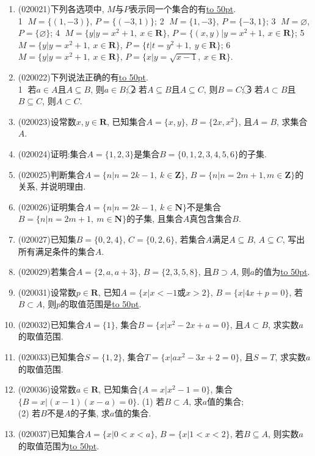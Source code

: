\documentclass[10pt,a4paper]{article}
\newcommand{\blank}[1]{\underline{\hbox to #1pt{}}}
\begin{document}
\begin{enumerate}[1.]
\item {\tiny (020021)}下列各选项中, $M$与$P$表示同一个集合的有\blank{50}.\\
\textcircled{1} $M=\{(1, -3)\}$, $P=\{(-3, 1)\}$; \textcircled{2} $M=\{1, -3\}$, $P=\{-3, 1\}$; \textcircled{3} $M=\varnothing$, $P=\{\varnothing\}$; \textcircled{4} $M=\{y|y=x^2+1, \  x\in\mathbf{R}\}$, $P=\{(x, y)|y=x^2+1, \ x\in\mathbf{R}\}$; \textcircled{5} $M=\{y|y=x^2+1, \  x\in\mathbf{R}\}$, $P=\{t|t=y^2+1, \ y\in\mathbf{R}\}$; \textcircled{6} $M=\{y|y=x^2+1, \  x\in\mathbf{R}\}$, $P=\{x|y=\sqrt{x-1},\  x\in\mathbf{R}\}$.
\item {\tiny (020022)}下列说法正确的有\blank{50}.\\
\textcircled{1} 若$a\in A$且$A\subseteq B$, 则$a\in B$; \textcircled{2} 若$A\subseteq B$且$A\subseteq C$, 则$B=C$; \textcircled{3} 若$A\subset B$且$B\subseteq C$, 则$A\subset C$.
\item {\tiny (020023)}设常数$x,y\in \mathbf{R}$, 已知集合$A=\{x, y\}$, $B=\{2x, x^2\}$, 且$A=B$, 求集合$A$.
\item {\tiny (020024)}证明:集合$A=\{1,2,3\}$是集合$B=\{0,1,2,3,4,5,6\}$的子集.
\item {\tiny (020025)}判断集合$A=\{n|n=2k-1,\ k\in \mathbf{Z}\}$, $B=\{n|n=2m+1,m\in \mathbf{Z}\}$的关系, 并说明理由.
\item {\tiny (020026)}证明集合$A=\{n|n=2k-1,\ k\in \mathbf{N}\}$不是集合$B=\{n|n=2m+1, \ m\in \mathbf{N}\}$的子集, 且集合$A$真包含集合$B$.
\item {\tiny (020027)}已知集$B=\{0, 2, 4\}$, $C=\{0, 2, 6\}$, 若集合$A$满足$A\subseteq B$, $A\subseteq C$, 写出所有满足条件的集合$A$.
\item {\tiny (020029)}若集合$A=\{2,a,a+3\}$, $B=\{2,3,5,8\}$, 且$B\supset A$, 则$a$的值为\blank{50}.
\item {\tiny (020031)}设常数$p\in\mathbf{R}$, 已知$A=\{x|x<-1$或$x>2\}$, $B=\{x|4x+p=0\}$, 若$B\subset A$, 则$p$的取值范围是\blank{50}.
\item {\tiny (020032)}已知集合$A=\{1\}$, 集合$B=\{x|x^2-2x+a=0\}$, 且$A\subset B$, 求实数$a$的取值范围.
\item {\tiny (020033)}已知集合$S=\{1, 2\}$, 集合$T=\{x|ax^2-3x+2=0\}$, 且$S=T$, 求实数$a$的取值范围.
\item {\tiny (020036)}设常数$a\in \mathbf{R}$, 已知集合$\{A=x|x^2-1=0\}$, 集合$\{B=x|(x-1)(x-a)=0\}$.
(1) 若$B\subset A$, 求$a$值的集合;\\
(2) 若$B$不是$A$的子集, 求$a$值的集合.
\item {\tiny (020037)}已知集合$A=\{x|0<x<a\}$, $B=\{x|1<x<2\}$, 若$B\subseteq A$, 则实数$a$的取值范围为\blank{50}.

\end{enumerate}
\end{document}
